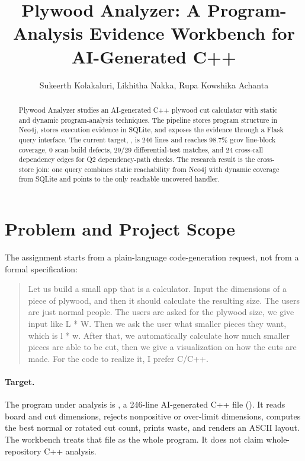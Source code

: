 \documentclass[11pt,twocolumn]{article}
\title{Plywood Analyzer: A Program-Analysis Evidence Workbench for AI-Generated C++}
\author{Sukeerth Kolakaluri, Likhitha Nakka, Rupa Kowshika Achanta}
\begin{document}
\maketitle

\begin{abstract}
Plywood Analyzer studies an AI-generated C++ plywood cut calculator with
static and dynamic program-analysis techniques. The pipeline stores program
structure in Neo4j, stores execution evidence in SQLite, and exposes the
evidence through a Flask query interface. The current target,
, is 246 lines and reaches 98.7\% gcov
line-block coverage, 0 scan-build defects, 29/29 differential-test matches,
and 24 cross-call dependency edges for Q2 dependency-path checks. The research
result is the cross-store join: one query combines static reachability from
Neo4j with dynamic coverage from SQLite and points to the only reachable
uncovered handler.
\end{abstract}

\section{Problem and Project Scope}

The assignment starts from a plain-language code-generation request, not from a
formal specification:

\begin{quote}
Let us build a small app that is a calculator. Input the dimensions
of a piece of plywood, and then it should calculate the resulting
size. The users are just normal people. The users are asked for the
plywood size, we give input like L * W. Then we ask the user what
smaller pieces they want, which is l * w. After that, we automatically
calculate how much smaller pieces are able to be cut, then we give a
visualization on how the cuts are made. For the code to realize it,
I prefer C/C++.
\end{quote}

\paragraph{Target.}
The program under analysis is , a 246-line
AI-generated C++ file (\cite{codex,pearce,lostatc,vaithilingam}). It reads board and cut dimensions, rejects nonpositive
or over-limit dimensions, computes the best normal or rotated cut count, prints
waste, and renders an ASCII layout. The workbench treats that file as the whole
program. It does not claim whole-repository C++ analysis.
\end{document}
